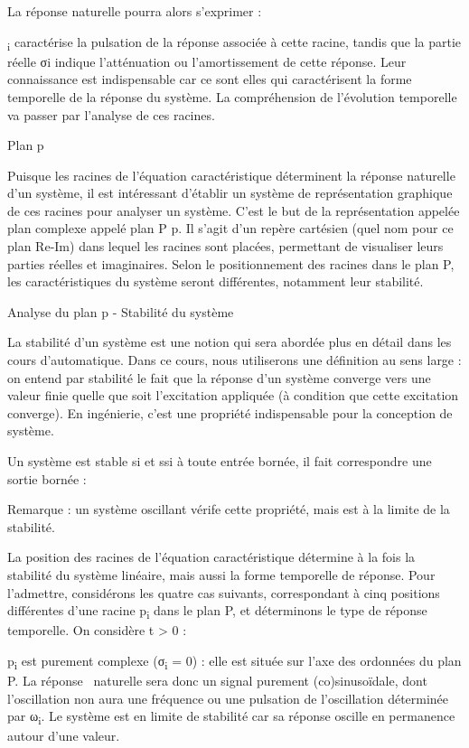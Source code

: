 \documentclass[]{article}
\begin{document}
La réponse naturelle pourra alors s'exprimer :

\textsubscript{i} caractérise la pulsation de la réponse associée à
cette racine, tandis que la partie réelle σi indique l'atténuation ou
l'amortissement de cette réponse. Leur connaissance est indispensable
car ce sont elles qui caractérisent la forme temporelle de la réponse du
système. La compréhension de l'évolution temporelle va passer par
l'analyse de ces racines.~

Plan p

Puisque les racines de l'équation caractéristique déterminent la réponse
naturelle d'un système, il est intéressant d'établir un système de
représentation graphique de ces racines pour analyser un système. C'est
le but de la représentation appelée plan complexe appelé plan P p. Il
s'agit d'un repère cartésien (quel nom pour ce plan Re-Im) dans lequel
les racines sont placées, permettant de visualiser leurs parties réelles
et imaginaires. Selon le positionnement des racines dans le plan P, les
caractéristiques du système seront différentes, notamment leur
stabilité.

Analyse du plan p - Stabilité du système

La stabilité d'un système est une notion qui sera abordée plus en détail
dans les cours d'automatique. Dans ce cours, nous utiliserons une
définition au sens large : on entend par stabilité le fait que la
réponse d'un système converge vers une valeur finie quelle que soit
l'excitation appliquée (à condition que cette excitation converge). En
ingénierie, c'est une propriété indispensable pour la conception de
système.

Un système est stable si et ssi à toute entrée bornée, il fait
correspondre une sortie bornée :

Remarque : un système oscillant vérife cette propriété, mais est à la
limite de la stabilité.

La position des racines de l'équation caractéristique détermine à la
fois la stabilité du système linéaire, mais aussi la forme temporelle de
réponse. Pour l'admettre, considérons les quatre cas suivants,
correspondant à cinq positions différentes d'une racine
p\textsubscript{i} dans le plan P, et déterminons le type de réponse
temporelle. On considère t \textgreater{} 0 :

p\textsubscript{i} est purement complexe (σ\textsubscript{i} = 0) : elle
est située sur l'axe des ordonnées du plan P. La réponse~ naturelle sera
donc un signal purement (co)sinusoïdale, dont l'oscillation non aura une
fréquence ou une pulsation de l'oscillation déterminée par
ω\textsubscript{i}. Le système est en limite de stabilité car sa réponse
oscille en permanence autour d'une valeur.
\end{document}
